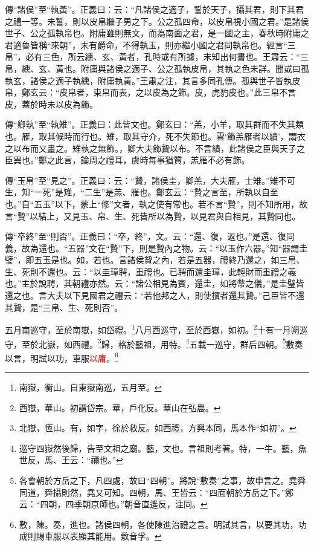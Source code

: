 {\noindent\zhuan{}\fzbyks 傳“諸侯”至“執黃”。正義曰：云：“凡諸侯之適子，誓於天子，攝其君，則下其君之禮一等。未誓，則以皮帛繼子男之下。公之孤四命，以皮帛視小國之君。”是諸侯世子、公之孤執帛也。附庸雖則無文，而為南面之君，是一國之主，春秋時附庸之君適魯皆稱“來朝”，未有爵命，不得執玉，則亦繼小國之君同執帛也。經言“三帛”，必有三色，所云纁、玄、黃者，孔時或有所據，末知出何書也。王肅云：“三帛，纁、玄、黃也。附庸與諸侯之適子、公之孤執皮帛，其執之色未詳。聞或曰孤執玄，諸侯之適子執纁，附庸執黃。”王肅之注，其言多同孔傳。孤與世子皆執皮帛，鄭玄云：“皮帛者，束帛而表，之以皮為之飾。皮，虎豹皮也。”此三帛不言皮，蓋於時未以皮為飾。 \par}

{\noindent\zhuan{}\fzbyks 傳“卿執”至“執雉”。正義曰：此皆文也。鄭玄曰：“羔，小羊，取其群而不失其類也。雁，取其候時而行也。雉，取其守介，死不失節也。雲‘飾羔雁者以繢’，謂衣之以布而又畫之。雉執之無飾。，卿大夫飾贄以布。不言繢，此諸侯之臣與天子之臣異也。”鄭之此言，論周之禮耳，虞時每事猶質，羔雁不必有飾。 \par}

{\noindent\zhuan{}\fzbyks 傳“玉帛”至“見之”。正義曰：云：“贄，諸侯圭，卿羔，大夫雁，士雉。”雉不可生，知“一死”是雉，“二生”是羔、雁也。鄭玄云：“贄之言至，所執以自至也。”自“五玉”以下，蒙上“修”文者，執之使有常也。若不言“贄”，則不知所用，故言“贄”以結上，又見玉、帛、生、死皆所以為贄，以見君與自相見，其贄同也。 \par}

{\noindent\zhuan{}\fzbyks 傳“卒終”至“則否”。正義曰：“卒，終”，文。云：“還、復，返也。”是還、復同義，故為還也。“五器”文在“贄”下，則是贄內之物。云：“以玉作六器。”知“器謂圭璧”，即五玉是也。如，若也。言諸侯贄之內，若是五器，禮終乃還之，如三帛、生、死則不還也。云：“以圭璋聘，重禮也。已聘而還圭璋，此輕財而重禮之義也。”主於說聘，其朝禮亦然。云：“諸公相見為賓，還圭，如將幣之儀。”是圭璧皆還之也。言大夫以下見國君之禮云：“若他邦之人，則使擯者還其贄。”己臣皆不還其贄，是“三帛、生、死則否”。 \par}

五月南巡守，至於南嶽，如岱禮。\footnote{南嶽，衡山。自東嶽南巡，五月至。}八月西巡守，至於西嶽，如初。\footnote{西嶽，華山。初謂岱宗。華，戶化反。華山在弘農。}十有一月朔巡守，至於北嶽，如西禮。\footnote{北嶽，恆山。有，如字，徐於救反。如西禮，方興本同，馬本作“如初”。}歸，格於藝祖，用特。\footnote{巡守四嶽然後歸，告至文祖之廟。藝，文也。言祖則考著。特，一牛。藝，魚世反，馬、王云：“禰也。”}五載一巡守，群后四朝。\footnote{各會朝於方岳之下，凡四處，故曰“四朝”。將說“敷奏”之事，故申言之。堯舜同道，舜攝則然，堯又可知。四朝，馬、王皆云：“四面朝於方岳之下。”鄭云：“四朝，四季朝京師也。”朝音直遙反，注同。}敷奏以言，明試以功，車服\textcolor{red}{以庸}。\footnote{敷，陳。奏，進也。諸侯四朝，各使陳進治禮之言。明試其言，以要其功，功成則賜車服以表顯其能用。敷音孚。}


